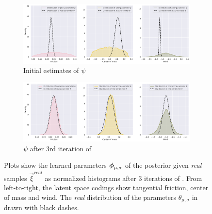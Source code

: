 \begin{figure}

\centering
\captionsetup{size=footnotesize}
\begin{subfigure}{\linewidth}
  \includegraphics[width=1.0\linewidth]{img/windyslope/latent-representation/new/iter0}
  \caption{Initial estimates of $\psi$}
  \label{fig_3_parameters_0}
\end{subfigure}
\begin{subfigure}{\linewidth}
  \includegraphics[width=1.0\linewidth]{img/windyslope/latent-representation/new/latent_encoding_iter3}
  \caption{$\psi$ after 3rd iteration of \dettostoc{}}
\end{subfigure}
\caption{Plots show the learned parameters $\boldsymbol{\phi}_{\mu, \sigma}$ of the posterior given \emph{real} samples $\vec{\xi}^{real}$ as normalized histograms after 3 iterations of \dettostoc{}.
From left-to-right, the latent space codings show tangential friction, center of mass and wind. %
The \emph{real} distribution of the parameters $\theta_{\mu, \sigma}$ in drawn with black dashes.}
\label{fig:windyslope_latent_space}

\end{figure}

